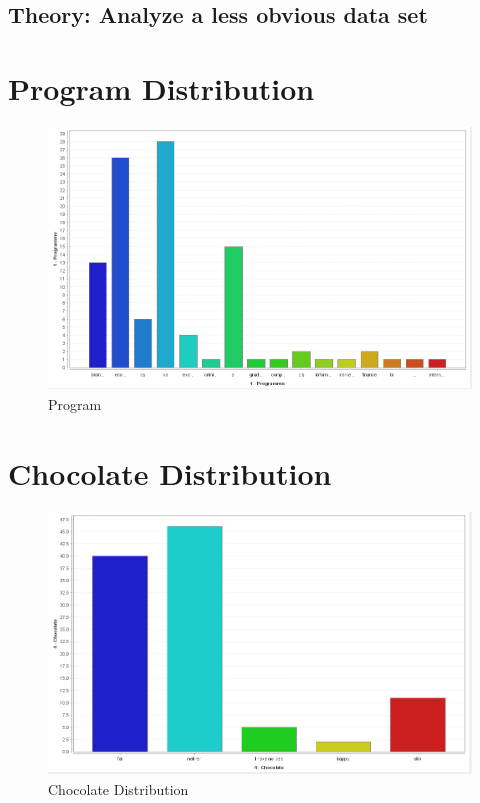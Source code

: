 \documentclass{vldb}
\begin{document}
	\subsection{Theory: Analyze a less obvious data set}
	
\begin{thebibliography}{99}

	
	
	
\end{thebibliography}	
		
\begin{appendices}
\onecolumn
\section{Program Distribution}\label{program}
		\begin{figure}[h]
			\centering
			\includegraphics[scale=0.4]{1.png}
			\caption{Program}
			\label{fig2}
		\end{figure}
\section{Chocolate Distribution}\label{chocolate}
		\begin{figure}[h]
			\centering
			\includegraphics[scale=0.4]{2.png}
			\caption{Chocolate Distribution}
			\label{fig3}
		\end{figure}

\end{appendices}
\end{document}
